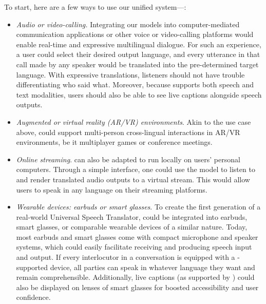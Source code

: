 To start, here are a few ways to use our unified system—\seamless:
\begin{itemize}
  \item \textit{Audio or video-calling.} Integrating our models into computer-mediated communication applications or other voice or video-calling platforms would enable real-time and expressive multilingual dialogue.
  For such an experience, a user could select their desired output language, and every utterance in that call made by any speaker would be translated into the pre-determined target language. With expressive translations, listeners should not have trouble differentiating who said what. Moreover, because \mfourttwo supports both speech and text modalities, users should also be able to see live captions alongside speech outputs.
  \item \textit{Augmented or virtual reality (AR/VR) environments}. Akin to the use case above, \seamless could support multi-person cross-lingual interactions in AR/VR environments, be it multiplayer games or conference meetings.
  \item \textit{Online streaming}. \seamless can also be adapted to run locally on users' personal computers. Through a simple interface, one could use the model to listen to and render translated audio outputs to a virtual stream. This would allow users to speak in any language on their streaming platforms.
  \item \textit{Wearable devices: earbuds or smart glasses}. To create the first generation of a real-world Universal Speech Translator, \seamless could be integrated into earbuds, smart glasses, or comparable wearable devices of a similar nature. Today, most earbuds and smart glasses come with compact microphone and speaker systems, which could easily facilitate receiving and producing speech input and output. If every interlocutor in a conversation is equipped with a \seamless-supported device, all parties can speak in whatever language they want and remain comprehensible. Additionally, live captions (as supported by \mfourttwo) could also be displayed on lenses of smart glasses for boosted accessibility and user confidence.
  

  \end{itemize}


